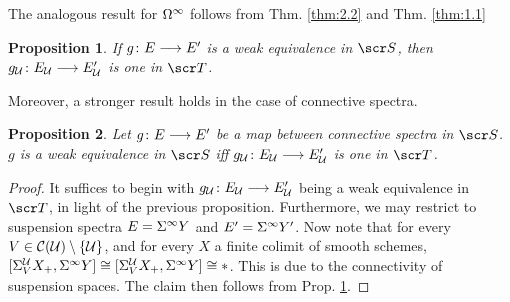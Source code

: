 \documentclass{amsart}
\newtheorem{prop}{Proposition}[section]
\theoremstyle{definition}
\begin{document}
The analogous result for $\Omega^{\infty}$ follows from Thm. \ref{thm:2.2} and Thm. \ref{thm:1.1}
\begin{prop}\label{prop:2.3}
If $g \colon E \longrightarrow E'$ is a weak equivalence in $\sS$, then $g_{{\mathcal{U}}} \colon E_{{\mathcal{U}}} \longrightarrow E_{{\mathcal{U}}}'$ is one in $\sT$.
\end{prop}

Moreover, a stronger result holds in the case of connective spectra.
\begin{prop}
Let $g \colon E \longrightarrow E'$ be a map between connective spectra in $\sS$. $g$ is a weak equivalence in $\sS$ iff $g_{{\mathcal{U}}} \colon E_{{\mathcal{U}}} \longrightarrow E'_{{\mathcal{U}}}$ is one in $\sT$. 
\end{prop}
\begin{proof}
It suffices to begin with $g_{{\mathcal{U}}} \colon E_{{\mathcal{U}}} \longrightarrow E'_{{\mathcal{U}}}$ being a weak equivalence in $\sT$, in light of the previous proposition. Furthermore, we may restrict to suspension spectra $E = \Sigma^{\infty} Y$ and $E' = \Sigma^{\infty}Y'$. Now note that for every $V \in {\mathcal{C}} ({\mathcal{U}}) \setminus \{{\mathcal{U}}\}$, and for every $X$ a finite colimit of smooth schemes, $[\Sigma^{{\mathcal{U}}}_V X_+, \Sigma^{\infty}Y] \cong [\Sigma^{{\mathcal{U}}}_V X_+, \Sigma^{\infty}Y] \cong *$. This is due to the connectivity of suspension spaces. The claim then follows from Prop. \ref{prop:2.3}.
\end{proof}
\end{document}
